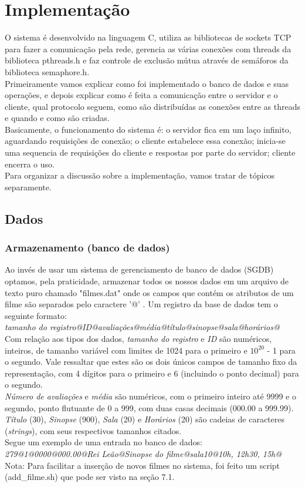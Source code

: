 \documentclass[11pt,twoside]{article}
\begin{document}
\section{Implementação}
O sistema é desenvolvido na linguagem C, utiliza as bibliotecas de sockets TCP para fazer a comunicação pela rede, gerencia as várias conexões com threads da biblioteca pthreads.h e faz controle de exclusão mútua através de semáforos da biblioteca semaphore.h.\\
Primeiramente vamos explicar como foi implementado o banco de dados e suas operações, e depois explicar como é feita a comunicação entre o servidor e o cliente, qual protocolo seguem, como são distribuídas as conexões entre as threads e quando e como são criadas.\\
Basicamente, o funcionamento do sistema é: o servidor fica em um laço infinito, aguardando requisições de conexão; o cliente estabelece essa conexão; inicia-se uma sequencia de requisições do cliente e respostas por parte do servidor; cliente encerra o uso.\\
Para organizar a discussão sobre a implementação, vamos tratar de tópicos separamente.

\subsection{Dados}
\subsubsection{Armazenamento (banco de dados)}
Ao invés de usar um sistema de gerenciamento de banco de dados (SGDB) optamos, pela praticidade, armazenar todos os nossos dados em um arquivo de texto puro chamado "filmes.dat" onde os campos que contém os atributos de um filme são separados pelo caractere '@' . Um registro da base de dados tem o seguinte formato:\\
\textit{tamanho do registro@ID@avaliações@média@título@sinopse@sala@horários@}\\
Com relação aos tipos dos dados, \textit{tamanho do registro} e \textit{ID} são numéricos, inteiros, de tamanho variável com limites de 1024 para o primeiro e $10^{20}$ - 1 para o segundo. Vale ressaltar que estes são os dois únicos campos de tamanho fixo da representação, com 4 dígitos para o primeiro e 6 (incluindo o ponto decimal) para o segundo.\\
\textit{Número de avaliações} e \textit{média} são numéricos, com o primeiro inteiro até 9999 e o segundo, ponto flutuante de 0 a 999, com duas casas decimais (000.00 a 999.99).\\
\textit{Título} (30), \textit{Sinopse} (900), \textit{Sala} (20) e \textit{Horários} (20) são cadeias de caracteres (\textit{strings}), com seus respectivos tamanhos citados.\\
Segue um exemplo de uma entrada no banco de dados:\\
\textit{279@1@0000@000.00@Rei Leão@Sinopse do filme@sala10@10h, 12h30, 15h@}\\
Nota: Para facilitar a inserção de novos filmes no sistema, foi feito um script (add\_filme.sh) que pode ser visto na seção 7.1.
\end{document}
